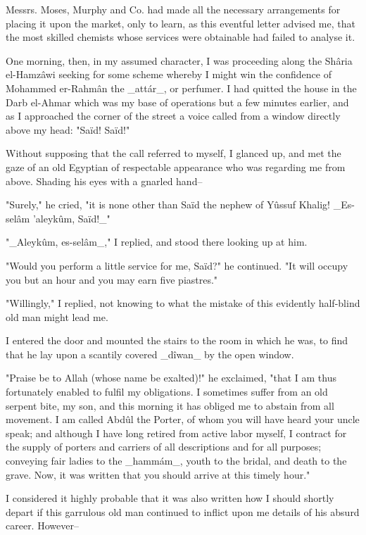 Messrs. Moses, Murphy and Co. had made all the necessary arrangements
for placing it upon the market, only to learn, as this eventful letter
advised me, that the most skilled chemists whose services were
obtainable had failed to analyse it.

One morning, then, in my assumed character, I was proceeding along
the Shâria el-Hamzâwi seeking for some scheme whereby I might win
the confidence of Mohammed er-Rahmân the _attár_, or perfumer. I had
quitted the house in the Darb el-Ahmar which was my base of operations
but a few minutes earlier, and as I approached the corner of the
street a voice called from a window directly above my head: "Saïd!
Saïd!"

Without supposing that the call referred to myself, I glanced up,
and met the gaze of an old Egyptian of respectable appearance who
was regarding me from above. Shading his eyes with a gnarled hand--

"Surely," he cried, "it is none other than Saïd the nephew of Yûssuf
Khalig! _Es-selâm 'aleykûm, Saïd!_"

"_Aleykûm, es-selâm_," I replied, and stood there looking up at him.

"Would you perform a little service for me, Saïd?" he continued.
"It will occupy you but an hour and you may earn five piastres."

"Willingly," I replied, not knowing to what the mistake of this
evidently half-blind old man might lead me.

I entered the door and mounted the stairs to the room in which he
was, to find that he lay upon a scantily covered _dîwan_ by the open
window.

"Praise be to Allah (whose name be exalted)!" he exclaimed, "that I am
thus fortunately enabled to fulfil my obligations. I sometimes suffer
from an old serpent bite, my son, and this morning it has obliged me
to abstain from all movement. I am called Abdûl the Porter, of whom you
will have heard your uncle speak; and although I have long retired from
active labor myself, I contract for the supply of porters and carriers
of all descriptions and for all purposes; conveying fair ladies to the
_hammám_, youth to the bridal, and death to the grave. Now, it was
written that you should arrive at this timely hour."

I considered it highly probable that it was also written how I should
shortly depart if this garrulous old man continued to inflict upon me
details of his absurd career. However--

